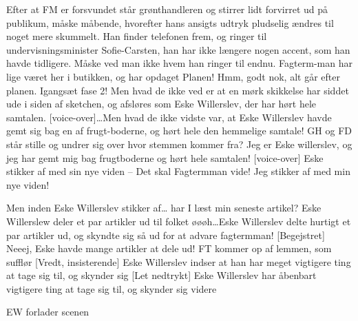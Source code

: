 \documentclass[a4paper,11pt]{article}
\begin{document}
\begin{sketch}
\scene Efter at FM er forsvundet står grønthandleren og stirrer lidt forvirret ud på publikum, måske måbende, hvorefter hans ansigts udtryk pludselig ændres til noget mere skummelt. Han finder telefonen frem, og ringer til undervisningsminister Sofie-Carsten, han har ikke længere nogen accent, som han havde tidligere. Måske ved man ikke hvem han ringer til endnu.
 Fagterm-man har lige været her i butikken, og har opdaget Planen!
 Hmm, godt nok, alt går efter planen. Igangsæt fase 2!
\scene Men hvad de ikke ved er at en mørk skikkelse har siddet ude i siden af sketchen, og afsløres som Eske Willerslev, der har hørt hele samtalen.
[voice-over]\ldots Men hvad de ikke vidste var, at Eske Willerslev havde gemt sig bag en af frugt-boderne, og hørt hele den hemmelige samtale!
\scene GH og FD står stille og undrer sig over hvor stemmen kommer fra?
 Jeg er Eske willerslev, og jeg har gemt mig bag frugtboderne og hørt hele samtalen!
[voice-over] Eske stikker af med sin nye viden -- Det skal Fagtermman vide!
 Jeg stikker af med min nye viden! 

 Men inden Eske Willerslev stikker af\ldots {} har I læst min seneste artikel?
\scene Eske Willerslew deler et par artikler ud til folket
 øøøh\ldots Eske Willerslev delte hurtigt et par artikler ud, og skyndte sig så ud for at advare fagtermman!
[Begejstret] Neeej, Eske havde mange artikler at dele ud!
\scene FT kommer op af lemmen, som sufflør
[Vredt, insisterende] Eske Willerslev indser at han har meget vigtigere ting at tage sig til, og skynder sig
[Let nedtrykt] Eske Willerslev har åbenbart vigtigere ting at tage sig til, og skynder sig videre
 
\scene EW forlader scenen

\end{sketch}
\end{document}
